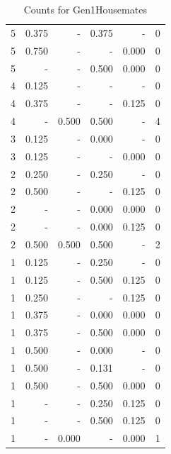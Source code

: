 \documentclass[a4paper]{article}\usepackage{graphicx, color}
\begin{document}
\begin{table}[ht]
\begin{tabular}{rrrrrr}
   \rowcolor{sosoColor} 5 & 0.375 & - & 0.375 & - & 0 \\ 
   \rowcolor{nullColor} 5 & 0.750 & - & - & 0.000 & 0 \\ 
   \rowcolor{sosoColor} 5 & - & - & 0.500 & 0.000 & 0 \\ 
   \rowcolor{nullColor} 4 & 0.125 & - & - & - & 0 \\ 
   \rowcolor{nullColor} 4 & 0.375 & - & - & 0.125 & 0 \\ 
   \rowcolor{goodColor} 4 & - & 0.500 & 0.500 & - & 4 \\ 
   \rowcolor{sosoColor} 3 & 0.125 & - & 0.000 & - & 0 \\ 
   \rowcolor{nullColor} 3 & 0.125 & - & - & 0.000 & 0 \\ 
   \rowcolor{sosoColor} 2 & 0.250 & - & 0.250 & - & 0 \\ 
   \rowcolor{nullColor} 2 & 0.500 & - & - & 0.125 & 0 \\ 
   \rowcolor{sosoColor} 2 & - & - & 0.000 & 0.000 & 0 \\ 
   \rowcolor{sosoColor} 2 & - & - & 0.000 & 0.125 & 0 \\ 
   \rowcolor{goodColor} 2 & 0.500 & 0.500 & 0.500 & - & 2 \\ 
   \rowcolor{sosoColor} 1 & 0.125 & - & 0.250 & - & 0 \\ 
   \rowcolor{sosoColor} 1 & 0.125 & - & 0.500 & 0.125 & 0 \\ 
   \rowcolor{nullColor} 1 & 0.250 & - & - & 0.125 & 0 \\ 
   \rowcolor{sosoColor} 1 & 0.375 & - & 0.000 & 0.000 & 0 \\ 
   \rowcolor{sosoColor} 1 & 0.375 & - & 0.500 & 0.000 & 0 \\ 
   \rowcolor{sosoColor} 1 & 0.500 & - & 0.000 & - & 0 \\ 
   \rowcolor{sosoColor} 1 & 0.500 & - & 0.131 & - & 0 \\ 
   \rowcolor{sosoColor} 1 & 0.500 & - & 0.500 & 0.000 & 0 \\ 
   \rowcolor{sosoColor} 1 & - & - & 0.250 & 0.125 & 0 \\ 
   \rowcolor{sosoColor} 1 & - & - & 0.500 & 0.125 & 0 \\ 
  1 & - & 0.000 & - & 0.000 & 1 \\ 
   \hline
\end{tabular}
\caption{Counts for Gen1Housemates} 
\end{table}
\end{document}
